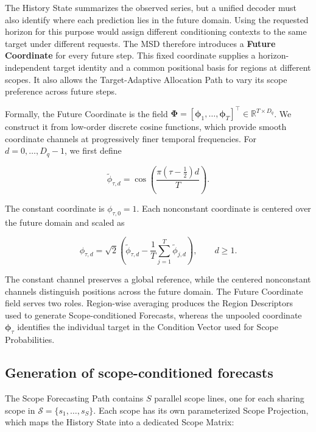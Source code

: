 \documentclass[final,3p,times]{elsarticle}
\begin{document}
The History State summarizes the observed series, but a unified decoder must also identify where each prediction lies in the future domain. Using the requested horizon for this purpose would assign different conditioning contexts to the same target under different requests. The MSD therefore introduces a \textbf{Future Coordinate} for every future step. This fixed coordinate supplies a horizon-independent target identity and a common positional basis for regions at different scopes. It also allows the Target-Adaptive Allocation Path to vary its scope preference across future steps.

Formally, the Future Coordinate is the field $\boldsymbol\Phi=[\boldsymbol\phi_1,\ldots,\boldsymbol\phi_T]^\top\in\mathbb R^{T\times D_q}$. We construct it from low-order discrete cosine functions, which provide smooth coordinate channels at progressively finer temporal frequencies. For $d=0,\ldots,D_q-1$, we first define

\begin{equation}
\widetilde\phi_{\tau,d}
=
\cos\!\left(
\frac{\pi(\tau-\tfrac12)d}{T}
\right).
\end{equation}


The constant coordinate is $\phi_{\tau,0}=1$. Each nonconstant coordinate is centered over the future domain and scaled as

\begin{equation}
\phi_{\tau,d}
=
\sqrt{2}
\left(
\widetilde\phi_{\tau,d}
-
\frac{1}{T}
\sum_{j=1}^{T}
\widetilde\phi_{j,d}
\right),
\qquad d\geq 1.
\end{equation}


The constant channel preserves a global reference, while the centered nonconstant channels distinguish positions across the future domain. The Future Coordinate field serves two roles. Region-wise averaging produces the Region Descriptors used to generate Scope-conditioned Forecasts, whereas the unpooled coordinate $\boldsymbol\phi_\tau$ identifies the individual target in the Condition Vector used for Scope Probabilities.

\subsection{Generation of scope-conditioned forecasts}


The Scope Forecasting Path contains $S$ parallel scope lines, one for each sharing scope in $\mathcal S=\{s_1,\ldots,s_S\}$. Each scope has its own parameterized Scope Projection, which maps the History State into a dedicated Scope Matrix:
\end{document}
